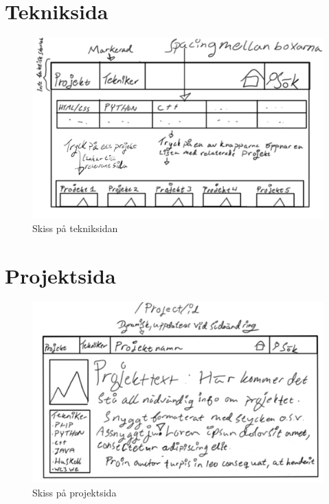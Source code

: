 \documentclass{TDP003mall}
\begin{document}
\section{Tekniksida}
\begin{figure}[H]
  \includegraphics[width=\linewidth]{tekniker.jpg}
  \caption{Skiss på tekniksidan}
  \label{fig:index}
\end{figure}

\section{Projektsida}
\begin{figure}[H]
  \includegraphics[width=\linewidth]{projekt_id.jpg}
  \caption{Skiss på projektsida}
  \label{fig:index}
\end{figure}
\end{document}
